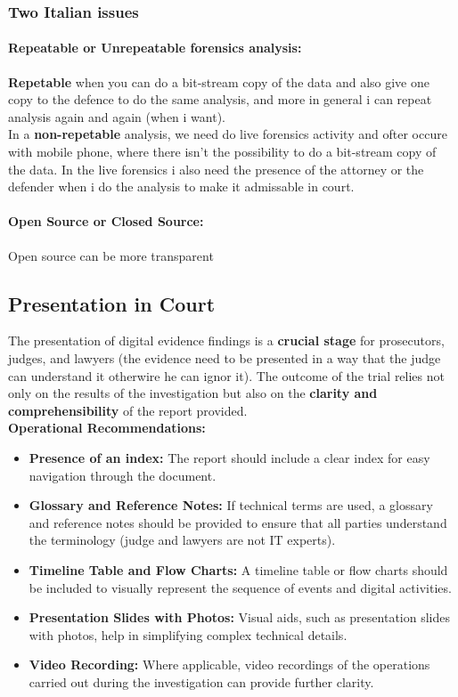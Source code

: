 \subsubsection{Two Italian issues}

\paragraph{Repeatable or Unrepeatable forensics analysis: }
\textbf{Repetable} when you can do a bit-stream copy of the data and also give one copy to the defence to do the same analysis, and more in general i can repeat analysis again and again (when i want). \\ In a \textbf{non-repetable} analysis, we need do live forensics activity and ofter occure with mobile phone, where there isn't the possibility to do a bit-stream copy of the data. In the live forensics i also need the presence of the attorney or the defender when i do the analysis to make it admissable in court.

\paragraph{Open Source or Closed Source:} %
Open source can be more transparent

\subsection{Presentation in Court}

The presentation of digital evidence findings is a \textbf{crucial stage} for prosecutors, judges, and lawyers (the evidence need to be presented in a way that the judge can understand it otherwire he can ignor it). The outcome of the trial relies not only on the results of the investigation but also on the \textbf{clarity and comprehensibility} of the report provided. \\

\textbf{Operational Recommendations:}
\begin{itemize}
  \item \textbf{Presence of an index:} The report should include a clear index for easy navigation through the document.
  \item \textbf{Glossary and Reference Notes:} If technical terms are used, a glossary and reference notes should be provided to ensure that all parties understand the terminology (judge and lawyers are not IT experts).
  \item \textbf{Timeline Table and Flow Charts:} A timeline table or flow charts should be included to visually represent the sequence of events and digital activities.
  \item \textbf{Presentation Slides with Photos:} Visual aids, such as presentation slides with photos, help in simplifying complex technical details.
  \item \textbf{Video Recording:} Where applicable, video recordings of the operations carried out during the investigation can provide further clarity.
\end{itemize}

